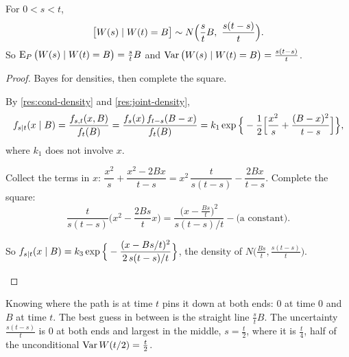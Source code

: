 \begin{theorem}[$W(s)$ given $W(t)=B$, for $s<t$]
\label{thm:bridge-law}
For $0<s<t$,
\[
  \big[W(s)\mid W(t)=B\big]\sim N\Big(\frac stB,\ \frac{s(t-s)}{t}\Big).
\]
So $\operatorname{E}_P\big(W(s)\mid W(t)=B\big)=\frac stB$ and $\operatorname{Var}\big(W(s)\mid W(t)=B\big)=\frac{s(t-s)}{t}$.
\end{theorem}
\begin{proof}
Bayes for densities, then complete the square.
\begin{steps}
  \item By \cref{res:cond-density} and \cref{res:joint-density},
  \[
    f_{s\mid t}(x\mid B)=\frac{f_{s,t}(x,B)}{f_t(B)}=\frac{f_s(x)\,f_{t-s}(B-x)}{f_t(B)}
    =k_1\exp\Big\{-\frac12\Big[\frac{x^2}{s}+\frac{(B-x)^2}{t-s}\Big]\Big\},
  \]
  where $k_1$ does not involve $x$.
  \item Collect the terms in $x$: $\dfrac{x^2}{s}+\dfrac{x^2-2Bx}{t-s}=x^2\,\dfrac{t}{s(t-s)}-\dfrac{2Bx}{t-s}$. Complete the square:
  \[
    \frac{t}{s(t-s)}\Big(x^2-\frac{2Bs}{t}x\Big)=\frac{\big(x-\frac{Bs}{t}\big)^2}{s(t-s)/t}-\text{(a constant)}.
  \]
  \item So $f_{s\mid t}(x\mid B)=k_3\exp\Big\{-\dfrac{(x-Bs/t)^2}{2\,s(t-s)/t}\Big\}$, the density of $N\big(\frac{Bs}{t},\frac{s(t-s)}{t}\big)$. \qedhere
\end{steps}
\end{proof}

\begin{intuition}
Knowing where the path is at time $t$ pins it down at both ends: $0$ at time $0$ and $B$ at time $t$. The best guess in between is the straight line $\frac stB$. The uncertainty $\frac{s(t-s)}{t}$ is $0$ at both ends and largest in the middle, $s=\frac t2$, where it is $\frac t4$, half of the unconditional $\operatorname{Var} W(t/2)=\frac t2$.
\end{intuition}

\begin{pic}
\end{pic}


